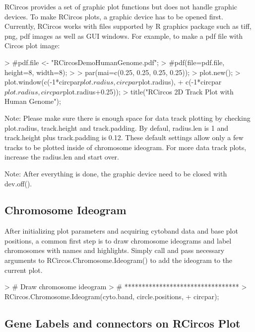 \documentclass{article}
\begin{document}
RCircos provides a set of graphic plot functions but does not handle graphic devices. To make RCircos plots, a graphic device has to be opened first. Currently, RCircos works with files supported by R graphics package such as tiff, png, pdf images as well as GUI windows.  For example, to make a pdf file with Circos plot image:

\begin{Schunk}
\begin{Sinput}
> #pdf.file <- "RCircosDemoHumanGenome.pdf";
> #pdf(file=pdf.file, height=8, width=8);
> 
> par(mai=c(0.25, 0.25, 0.25, 0.25));
> plot.new();
> plot.window(c(-1*circpar$plot.radius, circpar$plot.radius), 
+ 	c(-1*circpar$plot.radius, circpar$plot.radius+0.25));
> title("RCircos 2D Track Plot with Human Genome");
\end{Sinput}
\end{Schunk}


Note: Please make sure there is enough space for data track plotting by checking plot.radius, track.height and track.padding. By defaul, radius.len is 1 and track.height plus track.padding is 0.12. These default settings allow only a few tracks to be plotted inside of chromosome ideogram. For more data track plots, increase the radius.len and start over.


Note: After everything is done, the graphic device need to be closed with dev.off().


\subsection{Chromosome Ideogram}

After initializing plot parameters and acquiring cytoband data and base plot positions, a common first step is to draw chromosome ideograms and label chromosomes with names and highlights. Simply call and pass necessary arguments to RCircos.Chromosome.Ideogram() to add the ideogram to the current plot. 

\begin{Schunk}
\begin{Sinput}
> #	Draw chromosome ideogram
> #	*********************************
> RCircos.Chromosome.Ideogram(cyto.band, circle.positions, 
+ 			circpar);
\end{Sinput}
\end{Schunk}


\subsection{Gene Labels and connectors on RCircos Plot}
\end{document}
